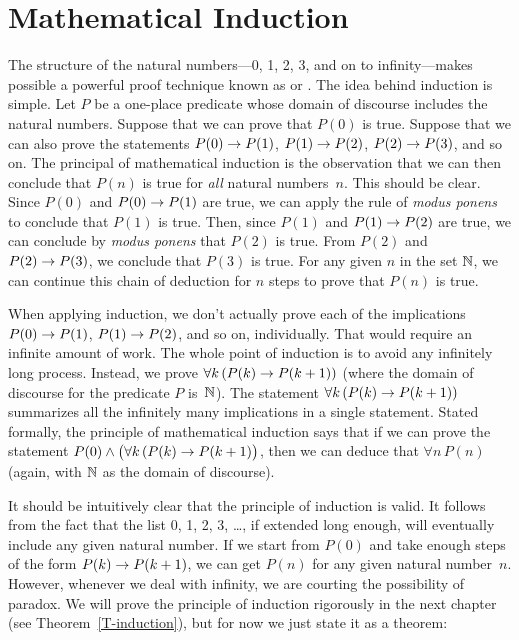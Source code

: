 \section{Mathematical Induction}


The structure of the natural numbers---0, 1, 2, 3, and on to infinity---makes 
possible a powerful proof technique known as  or .
The idea behind induction is simple.  Let $P$ be a one-place predicate
whose domain of discourse includes the natural numbers.  Suppose that
we can prove that $P(0)$ is true.  Suppose that we can also prove
the statements $P(0)\rightarrow P(1)$, $P(1)\rightarrow P(2)$, $P(2)\rightarrow P(3)$,
and so on.  The principal of mathematical induction is the observation
that we can then conclude that $P(n)$ is true for \textit{all} natural
numbers~$n$.
This should be clear.  Since $P(0)$ and $P(0)\rightarrow P(1)$ are true,
we can apply the rule of \textit{modus ponens} to conclude that $P(1)$
is true.  Then, since $P(1)$ and $P(1)\rightarrow P(2)$ are true, we can
conclude by \textit{modus ponens} that $P(2)$ is true.  From $P(2)$
and $P(2)\rightarrow P(3)$, we conclude that $P(3)$ is true.  For any
given $n$ in the set ${\mathbb N}$, we can continue this chain of deduction for $n$ steps
to prove that $P(n)$ is true.

When applying induction, we don't actually prove each of the
implications $P(0)\rightarrow P(1)$, $P(1)\rightarrow P(2)$, and so on, individually.
That would require an infinite amount of work.  The whole point of
induction is to avoid any infinitely long process.  Instead, we
prove $\forall k\,(P(k)\rightarrow P(k+1))$ (where the domain of discourse for the
predicate $P$ is~${\mathbb N}$).
The statement $\forall k\,(P(k)\rightarrow P(k+1))$ summarizes all the
infinitely many implications in a single statement.  Stated formally,
the principle of
mathematical induction says that if we can prove the statement
$P(0)\wedge \big(\forall k\,(P(k)\rightarrow P(k+1)\big)$, then we 
can deduce that $\forall n\,P(n)$ (again, with ${\mathbb N}$ as the domain
of discourse).

It should be intuitively clear that the principle of induction
is valid.  It follows from the fact that the list 0, 1, 2, 3, \dots,
if extended long enough, will eventually include any given
natural number.  If we start from $P(0)$ and take enough steps
of the form $P(k)\rightarrow P(k+1)$, we can get $P(n)$ for any given natural number~$n$.
However, whenever we deal with infinity, we are courting the possibility
of paradox.  We will prove the principle of induction rigorously
in the next chapter (see Theorem~\ref{T-induction}), but for now
we just state it as a theorem:

